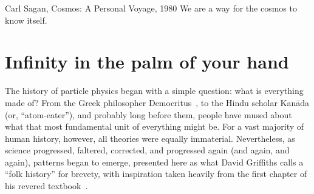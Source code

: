 \begin{dissertationintroduction}
\begin{aquote}{Carl Sagan, Cosmos: A Personal Voyage, 1980}
    We are a way for the cosmos to know itself.
\end{aquote}

\section*{Infinity in the palm of your hand}
The history of particle physics began with a simple question: what is everything made of? 
From the Greek philosopher Democritus~\cite{Taylor1419554}, to the Hindu scholar Kan\=ada (or, ``atom-eater''), and probably long before them, people have mused about what that most fundamental unit of everything might be. %
For a vast majority of human history, however, all theories were equally immaterial. 
Nevertheless, as science progressed, faltered, corrected, and progressed again (and again, and again), patterns began to emerge, presented here as what David Griffiths calls a ``folk history'' for brevety, with inspiration taken heavily from the first chapter of his revered textbook~\cite{GriffithsParticle}.  


\end{dissertationintroduction}
